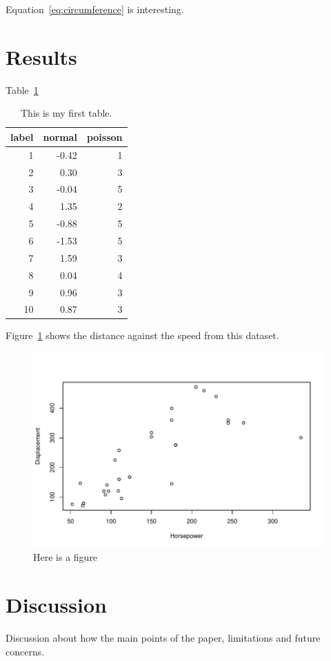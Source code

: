 \documentclass[12pt]{article}
\begin{document}
Equation~\eqref{eq:circumference} is interesting. 



\section{Results}
\label{sec:resu}

Table~\ref{thetab}
\lipsum[1-4]

\begin{table}[tbp]
  \caption{This is my first table.}
  \label{thetab}
\centering
\begin{tabular}{rrr}
  \toprule
label & normal & poisson \\ 
  \midrule
  1 & -0.42 &   1 \\ 
    2 & 0.30 &   3 \\ 
    3 & -0.04 &   5 \\ 
    4 & 1.35 &   2 \\ 
    5 & -0.88 &   5 \\ 
    6 & -1.53 &   5 \\ 
    7 & 1.59 &   3 \\ 
    8 & 0.04 &   4 \\ 
    9 & 0.96 &   3 \\ 
   10 & 0.87 &   3 \\ 
   \bottomrule
\end{tabular}
\end{table}

Figure~\ref{fig:cars} shows the distance against the speed from this dataset.


\begin{figure}[tbp]
  \centering
  \includegraphics[width=\textwidth]{carfig.pdf}
  \caption{Here is a figure}
  \label{fig:cars}
\end{figure}

\section{Discussion}
\label{sec:disc}

Discussion about how the main points of the paper, limitations and future concerns.




\end{document}
